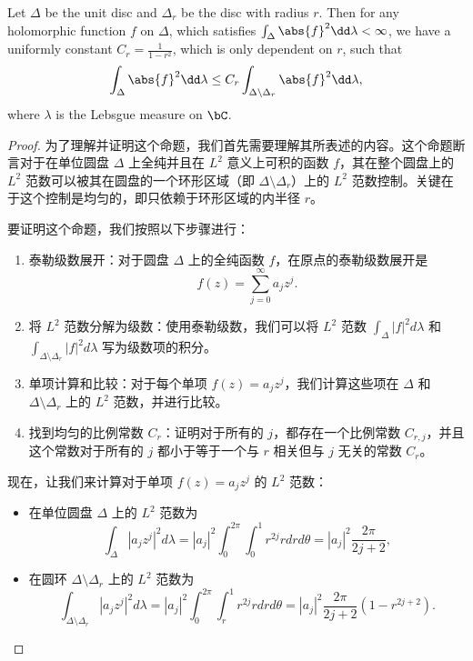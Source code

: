 \begin{lemma}
Let $\Delta$ be the unit disc and $\Delta_r$ be the disc with radius $r$. Then for any holomorphic function $f$ on $\Delta$, which satisfies $\int_\Delta \abs{f}^2 \dd \lambda<\infty$, we have a uniformly constant $C_r=\frac{1}{1-r^2}$, which is only dependent on $r$, such that \[\int_\Delta \abs{f}^2\dd \lambda\leq C_r \int_{\Delta\backslash \Delta_r}\abs{f}^2\dd \lambda,\]
where $\lambda$ is the Lebsgue measure on $\bC$.
\end{lemma}
\begin{proof}
  
为了理解并证明这个命题，我们首先需要理解其所表述的内容。这个命题断言对于在单位圆盘 \(\Delta\) 上全纯并且在 \(L^2\) 意义上可积的函数 \(f\)，其在整个圆盘上的 \(L^2\) 范数可以被其在圆盘的一个环形区域（即 \(\Delta \setminus \Delta_r\)）上的 \(L^2\) 范数控制。关键在于这个控制是均匀的，即只依赖于环形区域的内半径 \(r\)。

要证明这个命题，我们按照以下步骤进行：
\begin{enumerate}
  \item 泰勒级数展开：对于圆盘 \(\Delta\) 上的全纯函数 \(f\)，在原点的泰勒级数展开是 \[f(z) = \sum_{j=0}^{\infty} a_j z^j.\]
  \item 将 \(L^2\) 范数分解为级数：使用泰勒级数，我们可以将 \(L^2\) 范数 \(\int_\Delta |f|^2 d\lambda\) 和 \(\int_{\Delta \setminus \Delta_r} |f|^2 d\lambda\) 写为级数项的积分。
  \item 单项计算和比较：对于每个单项 \(f(z) = a_j z^j\)，我们计算这些项在 \(\Delta\) 和 \(\Delta \setminus \Delta_r\) 上的 \(L^2\) 范数，并进行比较。
  \item 找到均匀的比例常数 \(C_r\)：证明对于所有的 \(j\)，都存在一个比例常数 \(C_{r,j}\)，并且这个常数对于所有的 \(j\) 都小于等于一个与 \(r\) 相关但与 \(j\) 无关的常数 \(C_r\)。
\end{enumerate}


现在，让我们来计算对于单项 \(f(z) = a_j z^j\) 的 \(L^2\) 范数：
\begin{itemize}
  \item 在单位圆盘 \(\Delta\) 上的 \(L^2\) 范数为 \[\int_\Delta |a_j z^j|^2 d\lambda = |a_j|^2 \int_0^{2\pi} \int_0^1 r^{2j} r dr d\theta = |a_j|^2 \frac{2\pi}{2j+2},\]
  \item 在圆环 \(\Delta \setminus \Delta_r\) 上的 \(L^2\) 范数为 \[\int_{\Delta \setminus \Delta_r} |a_j z^j|^2 d\lambda = |a_j|^2 \int_0^{2\pi} \int_r^1 r^{2j} r dr d\theta = |a_j|^2 \frac{2\pi}{2j+2}(1-r^{2j+2}).\]
\end{itemize}



\end{proof}
